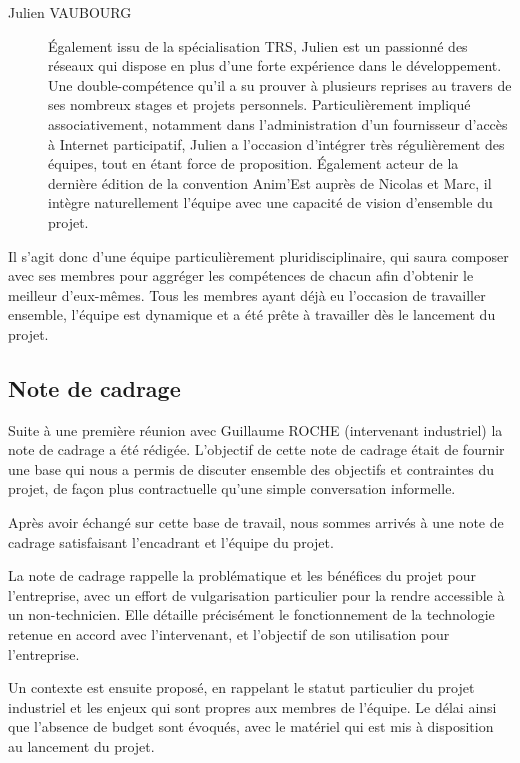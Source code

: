 \begin{description}
\item[Julien VAUBOURG] Également issu de la spécialisation TRS, Julien est un passionné des réseaux qui dispose en plus d'une forte expérience dans le développement. Une double-compétence qu'il a su prouver à plusieurs reprises au travers de ses nombreux stages et projets personnels. Particulièrement impliqué associativement, notamment dans l'administration d'un fournisseur d'accès à Internet participatif, Julien a l'occasion d'intégrer très régulièrement des équipes, tout en étant force de proposition. Également acteur de la dernière édition de la convention Anim'Est auprès de Nicolas et Marc, il intègre naturellement l'équipe avec une capacité de vision d'ensemble du projet.
\end{description}

Il s'agit donc d'une équipe particulièrement pluridisciplinaire, qui saura composer avec ses membres pour aggréger les compétences de chacun afin d'obtenir le meilleur d'eux-mêmes. Tous les membres ayant déjà eu l'occasion de travailler ensemble, l'équipe est dynamique et a été prête à travailler dès le lancement du projet.

\subsection{Note de cadrage}

Suite à une première réunion avec Guillaume ROCHE (intervenant industriel) la note de cadrage a été rédigée. L'objectif de cette note de cadrage était de fournir une base qui nous a permis de discuter ensemble des objectifs et contraintes du projet, de façon plus contractuelle qu'une simple conversation informelle.

Après avoir échangé sur cette base de travail, nous sommes arrivés à une note de cadrage satisfaisant l'encadrant et l'équipe du projet.

La note de cadrage rappelle la problématique et les bénéfices du projet pour l'entreprise, avec un effort de vulgarisation particulier pour la rendre accessible à un non-technicien. Elle détaille précisément le fonctionnement de la technologie retenue en accord avec l'intervenant, et l'objectif de son utilisation pour l'entreprise. 

Un contexte est ensuite proposé, en rappelant le statut particulier du projet industriel et les enjeux qui sont propres aux membres de l'équipe. Le délai ainsi que l'absence de budget sont évoqués, avec le matériel qui est mis à disposition au lancement du projet.

